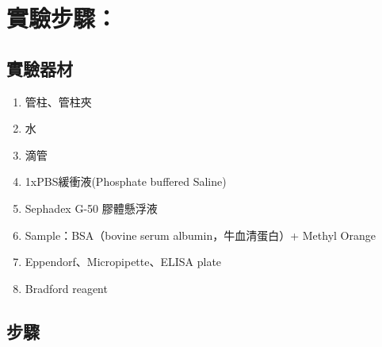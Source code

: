 \section*{實驗步驟：}

\subsection*{實驗器材}

\begin{enumerate}[label=\arabic*.]
  \item 管柱、管柱夾
  \item 水
  \item 滴管
  \item 1xPBS緩衝液(Phosphate buffered Saline)
  \item Sephadex G-50 膠體懸浮液
  \item Sample：BSA（bovine serum albumin，牛血清蛋白）+ Methyl Orange
  \item	Eppendorf、Micropipette、ELISA plate
  \item	Bradford reagent
\end{enumerate}


\subsection*{步驟}

